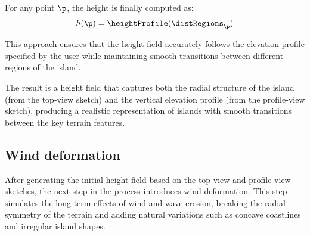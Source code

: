 
For any point $\p$, the height is finally computed as:
\begin{align}
    h(\p) = \heightProfile(\distRegions_\p)
\end{align}

This approach ensures that the height field accurately follows the elevation profile specified by the user while maintaining smooth transitions between different regions of the island.


The result is a height field that captures both the radial structure of the island (from the top-view sketch) and the vertical elevation profile (from the profile-view sketch), producing a realistic representation of islands with smooth transitions between the key terrain features.



\subsection{Wind deformation}

After generating the initial height field based on the top-view and profile-view sketches, the next step in the process introduces wind deformation. This step simulates the long-term effects of wind and wave erosion, breaking the radial symmetry of the terrain and adding natural variations such as concave coastlines and irregular island shapes.


